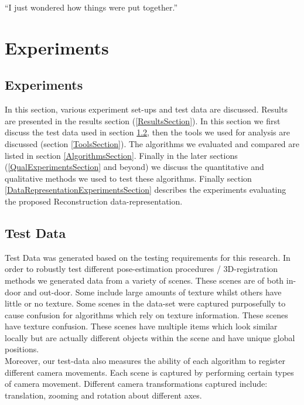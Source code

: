 \begin{savequote}[8cm]
  ``I just wondered how things were put together.''
\end{savequote}
\makeatletter
\chapter{Experiments}

\section{Experiments}

In this section, various experiment set-ups and test data are discussed. Results are presented in the results section (\ref{ResultsSection}). In this section we first discuss the test data used in section \ref{TestDataSection}, then the tools we used for analysis are discussed (section \ref{ToolsSection}). The algorithms we evaluated and compared are listed in section \ref{AlgorithmsSection}. Finally in the later sections (\ref{QualExperimentsSection} and beyond) we discuss the quantitative and qualitative methods we used to test these algorithms. Finally section \ref{DataRepresentationExperimentsSection} describes the experiments evaluating the proposed Reconstruction data-representation. 

\section{Test Data}

\label{TestDataSection}

Test Data was generated based on the testing requirements for this research. In order to robustly test different pose-estimation procedures / 3D-registration methods we generated data from a variety of scenes. These scenes are of both in-door and out-door. Some include large amounts of texture whilst others have little or no texture. Some scenes in the data-set were captured purposefully to cause confusion for algorithms which rely on texture information. These scenes have texture confusion. These scenes have multiple items which look similar locally but are actually different objects within the scene and have unique global positions. \\

Moreover, our test-data also measures the ability of each algorithm to register different camera movements. Each scene is captured by performing certain types of camera movement. Different camera transformations captured include: translation, zooming and rotation about different axes. \\

